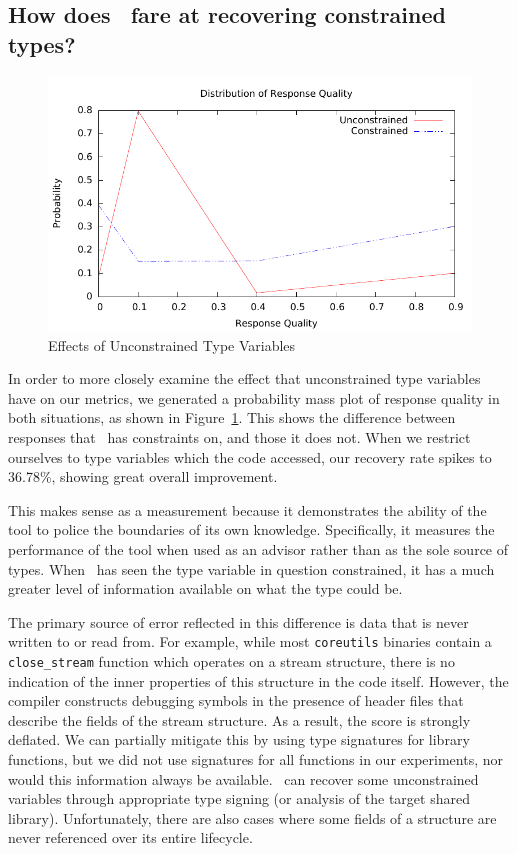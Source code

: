 \subsection{How does \bitr\ fare at recovering constrained types?}
\begin{figure}
	\begin{center}
\includegraphics[scale=1.1]{bitr/quality.pdf}
	\end{center}
\caption{Effects of Unconstrained Type Variables}
\label{fig:unconst}
\end{figure}

In order to more closely examine the effect that unconstrained type variables have on our metrics, we generated a probability mass plot of response quality in both situations, as shown in Figure~\ref{fig:unconst}. This shows the
difference between responses that \bitr\ has constraints on, and those it does not.
When we restrict ourselves to type variables which the code accessed, our recovery rate spikes to 36.78\%, showing great overall improvement.

This makes sense as a measurement because it demonstrates the ability of the tool to police the boundaries of its own knowledge. Specifically, it measures the performance of the tool when used as an advisor rather than as the sole source of types. When \bitr\ has seen the type variable in question constrained, it has a much greater level of information available on what the type could be.

The primary source of error reflected in this difference is data that is never written to or read from. For example, while most \texttt{coreutils} binaries contain a \texttt{close\_stream} function which operates on a stream structure, there is no indication of the inner properties of this structure in the code itself. However, the compiler constructs debugging symbols in the presence of header files that describe the fields of the stream structure. As a result, the score is strongly deflated.
We can partially mitigate this by using type signatures for library functions, but we did not use signatures for all functions in our experiments, nor would this information always be available.
\bitr\ can recover some unconstrained variables through appropriate type signing (or analysis of the target shared library).
Unfortunately, there are also cases where some fields of a structure are never referenced over its entire lifecycle.

